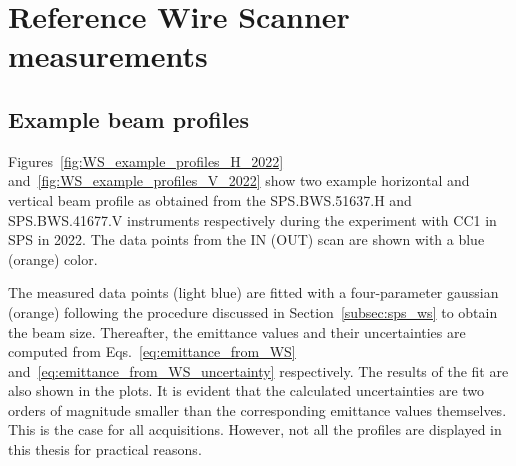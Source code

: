 \section{Reference Wire Scanner measurements}\label{sec:sps_transverse_beam_profiles}
\subsection{Example beam profiles}
Figures~\ref{fig:WS_example_profiles_H_2022} and~\ref{fig:WS_example_profiles_V_2022} show two example horizontal and vertical beam profile as obtained from the SPS.BWS.51637.H and SPS.BWS.41677.V instruments respectively during the experiment with CC1 in SPS in 2022. The data points from the IN (OUT) scan are shown with a blue (orange) color. 

The measured data points (light blue) are fitted with a four-parameter gaussian (orange) following the procedure discussed in Section~\ref{subsec:sps_ws} to obtain the beam size. Thereafter, the emittance values and their uncertainties are computed from Eqs.~\eqref{eq:emittance_from_WS} and~\eqref{eq:emittance_from_WS_uncertainty} respectively. The results of the fit are also shown in the plots. It is evident that the calculated uncertainties are two orders of magnitude smaller than the corresponding emittance values themselves. This is the case for all acquisitions. However, not all the profiles are displayed in this thesis for practical reasons.


